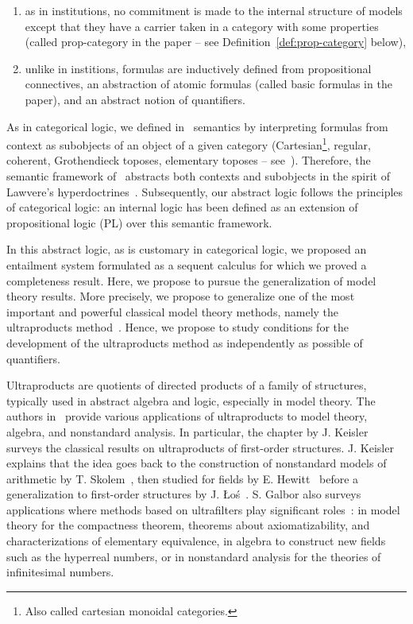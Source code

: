\documentclass[preprint,3p,times]{elsarticle}
\newcommand{\Los}{\L{}o{\'s}}
\begin{document}
\begin{enumerate}
    \item as in institutions, no commitment is made to the internal structure of models except that they have a carrier taken in a category with some properties (called prop-category in the paper -- see Definition~\ref{def:prop-category} below),
    \item unlike in institions, formulas are inductively defined from propositional connectives, an abstraction of atomic formulas (called basic formulas in the paper), and an abstract notion of quantifiers.
\end{enumerate}

As in categorical logic, we defined in~\cite{AB23} semantics by interpreting formulas from context as subobjects of an object of a given category (Cartesian\footnote{Also called cartesian monoidal categories.}, regular, coherent, Grothendieck toposes, elementary toposes -- see~\cite{Johnstone02}).
Therefore, the semantic framework of~\cite{AB23} abstracts both contexts and subobjects in the spirit of Lawvere's hyperdoctrines~\cite{Law69,Law70}. Subsequently, our abstract logic follows the principles of categorical logic: an internal logic has been defined as an extension of propositional logic (PL) over this semantic framework.

\medskip
In this abstract logic, as is customary in categorical logic, we proposed an entailment system formulated as a sequent calculus for which we proved a completeness result. Here, we propose to pursue the generalization of model theory results. More precisely, we propose to generalize one of the most important and powerful classical model theory methods, namely the ultraproducts method~\cite{CK73}. Hence, we propose to study conditions for the development of the ultraproducts method as independently as possible of quantifiers.

\medskip
Ultraproducts are quotients of directed products of a family of structures, typically used in abstract algebra and logic, especially in model theory. The authors in~\cite{bergelson_ultrafilters_2010} provide various applications of ultraproducts to model theory, algebra, and nonstandard analysis. In particular, the chapter by J. Keisler~\cite{keisler_ultraproduct_2010} surveys the classical results on ultraproducts of first-order structures. J. Keisler explains that the idea goes back to the construction of nonstandard models of arithmetic by T. Skolem~\cite{skolem_uber_1934}, then studied for fields by E. Hewitt~\cite{hewitt_rings_1948} before a generalization to first-order structures by J. \Los~\cite{los_quelques_1955}. S. Galbor also surveys applications where methods based on ultrafilters play significant roles~\cite{sagi_ultraproducts_2023}: in model theory for the compactness theorem, theorems about axiomatizability, and characterizations of elementary equivalence, in algebra to construct new fields such as the hyperreal numbers, or in nonstandard analysis for the theories of infinitesimal numbers.
\end{document}
